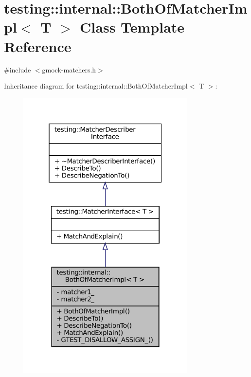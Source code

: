 \hypertarget{classtesting_1_1internal_1_1BothOfMatcherImpl}{}\section{testing\+:\+:internal\+:\+:Both\+Of\+Matcher\+Impl$<$ T $>$ Class Template Reference}
\label{classtesting_1_1internal_1_1BothOfMatcherImpl}


{\ttfamily \#include $<$gmock-\/matchers.\+h$>$}



Inheritance diagram for testing\+:\+:internal\+:\+:Both\+Of\+Matcher\+Impl$<$ T $>$\+:
\nopagebreak
\begin{figure}[H]
\begin{center}
\leavevmode
\includegraphics[width=253pt]{classtesting_1_1internal_1_1BothOfMatcherImpl__inherit__graph}
\end{center}
\end{figure}


